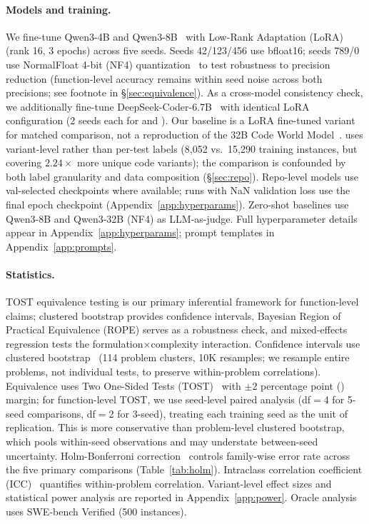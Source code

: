 \paragraph{Models and training.}
We fine-tune Qwen3-4B and Qwen3-8B~\cite{qwen2025qwen3} with Low-Rank Adaptation (LoRA)~\cite{hu2022lora} (rank 16, 3 epochs) across five seeds. Seeds 42/123/456 use bfloat16; seeds 789/0 use NormalFloat 4-bit (NF4) quantization~\cite{dettmers2024qlora} to test robustness to precision reduction (function-level accuracy remains within seed noise across both precisions; see footnote in \S\ref{sec:equivalence}). As a cross-model consistency check, we additionally fine-tune DeepSeek-Coder-6.7B~\cite{guo2024deepseekcoder} with identical LoRA configuration (2 seeds each for \cls{} and \cwm{}). Our \cwm{} baseline is a LoRA fine-tuned variant for matched comparison, not a reproduction of the 32B Code World Model~\cite{meta2025cwm}. \traj{} uses variant-level rather than per-test labels (8,052 vs.\ 15,290 training instances, but covering $2.24\times$ more unique code variants); the comparison is confounded by both label granularity and data composition (\S\ref{sec:repo}). Repo-level models use val-selected checkpoints where available; runs with NaN validation loss use the final epoch checkpoint (Appendix~\ref{app:hyperparams}). Zero-shot baselines use Qwen3-8B and Qwen3-32B (NF4) as LLM-as-judge. Full hyperparameter details appear in Appendix~\ref{app:hyperparams}; prompt templates in Appendix~\ref{app:prompts}.

\paragraph{Statistics.}
TOST equivalence testing is our primary inferential framework for function-level claims; clustered bootstrap provides confidence intervals, Bayesian Region of Practical Equivalence (ROPE) serves as a robustness check, and mixed-effects regression tests the formulation$\times$complexity interaction. Confidence intervals use clustered bootstrap~\cite{davison1997bootstrap} (114 problem clusters, 10K resamples; we resample entire problems, not individual tests, to preserve within-problem correlations). Equivalence uses Two One-Sided Tests (TOST)~\cite{schuirmann1987tost} with $\pm$2 percentage point (\pp{}) margin; for function-level TOST, we use seed-level paired analysis (df${=}$4 for 5-seed comparisons, df${=}$2 for 3-seed), treating each training seed as the unit of replication. This is more conservative than problem-level clustered bootstrap, which pools within-seed observations and may understate between-seed uncertainty. Holm-Bonferroni correction~\cite{holm1979} controls family-wise error rate across the five primary comparisons (Table~\ref{tab:holm}). Intraclass correlation coefficient (ICC)~\cite{shrout1979icc} quantifies within-problem correlation. Variant-level effect sizes and statistical power analysis are reported in Appendix~\ref{app:power}. Oracle analysis uses SWE-bench Verified (500 instances).


